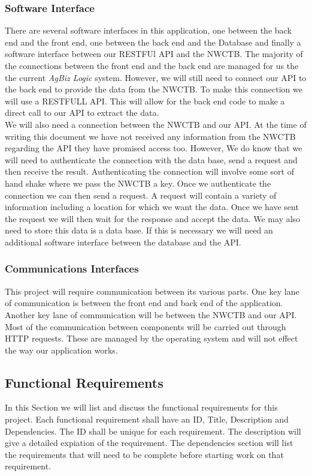 \documentclass[onecolumn, draftclsnofoot,10pt, compsoc]{article}
\begin{document}
        \subsubsection{Software Interface}
					There are several software interfaces in this application, one between the back end and the front end, one between the back end and the Database and finally a software interface between our RESTFUl API and the NWCTB. The majority of the connections between the front end and the back end are managed for us the the current \textit{AgBiz Logic} system. However, we will still need to connect our API to the back end to provide the data from the NWCTB. To make this connection we will use a RESTFULL API. This will allow for the back end code to make a direct call to our API to extract the data.\\
					We will also need a connection between the NWCTB and our API. At the time of writing this document we have not received any information from the NWCTB regarding the API they have promised access too. However, We do know that we will need to authenticate the connection with the data base, send a request and then receive the result. Authenticating the connection will involve some sort of hand shake where we pass the NWCTB a key. Once we authenticate the connection we can then send a request. A request will contain a variety of information including a location for which we want the data. Once we have sent the request we will then wait for the response and accept the data. We may also need to store this data is a data base. If this is necessary we will need an additional software interface between the database and the API.\\

        \subsubsection{Communications Interfaces}
					This project will require communication between its various parts. One key lane of communication is between the front end and back end of the application. Another key lane of communication will be between the NWCTB and our API. Most of the communication between components will be carried out through HTTP requests. These are managed by the operating system and will not effect the way our application works.\\


		\subsection{Functional Requirements}
			In this Section we will list and discuss the functional requirements for this project. Each functional requirement shall have an ID, Title, Description and Dependencies. The ID shall be unique for each requirement. The description will give a detailed expiation of the requirement. The dependencies section will list the requirements that will need to be complete before starting work on that requirement.\\
\end{document}
